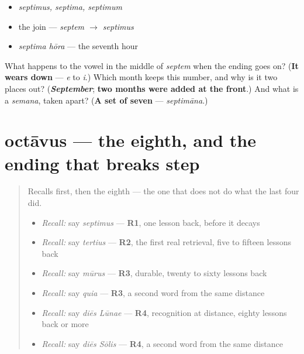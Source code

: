 \begin{itemize}
\raggedright
  \item \emph{septimus, septima, septimum}
  \item the join — \emph{septem $\to$ septimus}
  \item \emph{septima hōra} — the seventh hour
\end{itemize}

\begin{tcolorbox}[breakable,colback=teal!4,colframe=teal!35!black,title={Before you move on}]
What happens to the vowel in the middle of \emph{septem} when the ending goes on? (\textbf{It wears down} — \emph{e} to \emph{i}.) Which month keeps this number, and why is it two places out? (\emph{\textbf{September}}; \textbf{two months were added at the front}.) And what is a \emph{semana}, taken apart? (\textbf{A set of seven} — \emph{septimāna}.)
\end{tcolorbox}
\section[octāvus, octāva, octāvum]{octāvus — the eighth, and the ending that breaks step}

\label{lesson:LA-C56-octavus}



\begin{quote}
Recalls first, then the eighth — the one that does not do what the last four did.

\begin{itemize}
\raggedright
  \item \emph{Recall:} say \emph{septimus} — \textbf{R1}, one lesson back, before it decays
  \item \emph{Recall:} say \emph{tertius} — \textbf{R2}, the first real retrieval, five to fifteen lessons back
  \item \emph{Recall:} say \emph{mūrus} — \textbf{R3}, durable, twenty to sixty lessons back
  \item \emph{Recall:} say \emph{quia} — \textbf{R3}, a second word from the same distance
  \item \emph{Recall:} say \emph{diēs Lūnae} — \textbf{R4}, recognition at distance, eighty lessons back or more
  \item \emph{Recall:} say \emph{diēs Sōlis} — \textbf{R4}, a second word from the same distance
\end{itemize}
\end{quote}

